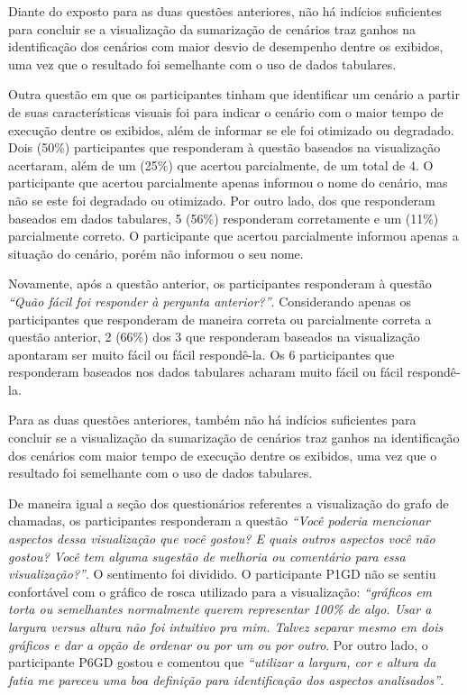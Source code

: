 \begin{framed}
  \noindent Diante do exposto para as duas questões anteriores, não há indícios suficientes para concluir se a visualização da sumarização de cenários traz ganhos na identificação dos cenários com maior desvio de desempenho dentre os exibidos, uma vez que o resultado foi semelhante com o uso de dados tabulares.
\end{framed}

Outra questão em que os participantes tinham que identificar um cenário a partir de suas características visuais foi para indicar o cenário com o maior tempo de execução dentre os exibidos, além de informar se ele foi otimizado ou degradado. Dois (50\%) participantes que responderam à questão baseados na visualização acertaram, além de um (25\%) que acertou parcialmente, de um total de 4. O participante que acertou parcialmente apenas informou o nome do cenário, mas não se este foi degradado ou otimizado. Por outro lado, dos que responderam baseados em dados tabulares, 5 (56\%) responderam corretamente e um (11\%) parcialmente correto. O participante que acertou parcialmente informou apenas a situação do cenário, porém não informou o seu nome.

Novamente, após a questão anterior, os participantes responderam à questão \textit{``Quão fácil foi responder à pergunta anterior?''}. Considerando apenas os participantes que responderam de maneira correta ou parcialmente correta a questão anterior, 2 (66\%) dos 3 que responderam baseados na visualização apontaram ser muito fácil ou fácil respondê-la. Os 6 participantes que responderam baseados nos dados tabulares acharam muito fácil ou fácil respondê-la.

\begin{framed}
  \noindent Para as duas questões anteriores, também não há indícios suficientes para concluir se a visualização da sumarização de cenários traz ganhos na identificação dos cenários com maior tempo de execução dentre os exibidos, uma vez que o resultado foi semelhante com o uso de dados tabulares.
\end{framed}

De maneira igual a seção dos questionários referentes a visualização do grafo de chamadas, os participantes responderam a questão \textit{``Você poderia mencionar aspectos dessa visualização que você gostou? E quais outros aspectos você não gostou? Você tem alguma sugestão de melhoria ou comentário para essa visualização?''}. O sentimento foi dividido. O participante P1GD não se sentiu confortável com o gráfico de rosca utilizado para a visualização: \textit{``gráficos em torta ou semelhantes normalmente querem representar 100\% de algo. Usar a largura versus altura não foi intuitivo pra mim. Talvez separar mesmo em dois gráficos e dar a opção de ordenar ou por um ou por outro}. Por outro lado, o participante P6GD gostou e comentou que \textit{``utilizar a largura, cor e altura da fatia me pareceu uma boa definição para identificação dos aspectos analisados''}.

